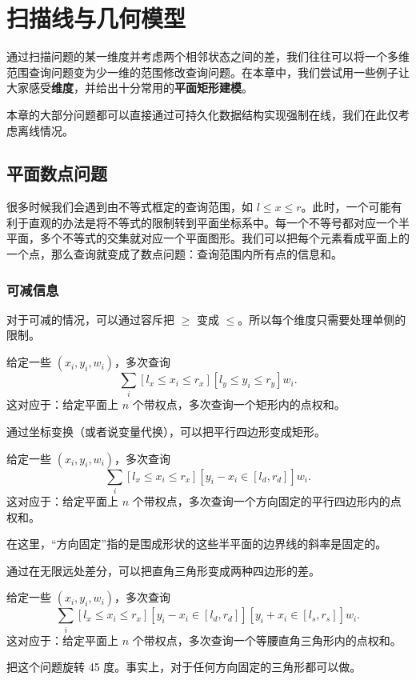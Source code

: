 \chapter{扫描线与几何模型}

通过扫描问题的某一维度并考虑两个相邻状态之间的差，我们往往可以将一个多维范围查询问题变为少一维的范围修改查询问题。在本章中，我们尝试用一些例子让大家感受\textbf{维度}，并给出十分常用的\textbf{平面矩形建模}。

本章的大部分问题都可以直接通过可持久化数据结构实现强制在线，我们在此仅考虑离线情况。


\section{平面数点问题}

很多时候我们会遇到由不等式框定的查询范围，如 $l\le x\le r$。此时，一个可能有利于直观的办法是将不等式的限制转到平面坐标系中。每一个不等号都对应一个半平面，多个不等式的交集就对应一个平面图形。我们可以把每个元素看成平面上的一个点，那么查询就变成了数点问题：查询范围内所有点的信息和。

\subsection{可减信息}

对于可减的情况，可以通过容斥把 $\ge$ 变成 $\le$。所以每个维度只需要处理单侧的限制。

\begin{example}[矩形数点]
    给定一些 $(x_i,y_i,w_i)$，多次查询
    $$
    \sum_i [l_x\le x_i\le r_x][l_y\le y_i\le r_y]w_i.
    $$
    这对应于：给定平面上 $n$ 个带权点，多次查询一个矩形内的点权和。
\end{example}

通过坐标变换（或者说变量代换），可以把平行四边形变成矩形。

\begin{example}[平行四边形数点]
    给定一些 $(x_i,y_i,w_i)$，多次查询
    $$
    \sum_i [l_x\le x_i\le r_x][y_i-x_i\in [l_{d},r_{d}]]w_i.
    $$
    这对应于：给定平面上 $n$ 个带权点，多次查询一个方向固定的平行四边形内的点权和。
\end{example}
\begin{remark}
    在这里，“方向固定”指的是围成形状的这些半平面的边界线的斜率是固定的。
\end{remark}

通过在无限远处差分，可以把直角三角形变成两种四边形的差。

\begin{example}[三角形数点]
    给定一些 $(x_i,y_i,w_i)$，多次查询
    $$
    \sum_i [l_x\le x_i\le r_x][y_i-x_i\in [l_{d},r_{d}]][y_i+x_i\in [l_{s},r_{s}]]w_i.
    $$
    这对应于：给定平面上 $n$ 个带权点，多次查询一个等腰直角三角形内的点权和。
\end{example}
\begin{exercise}
    把这个问题旋转 45 度。事实上，对于任何方向固定的三角形都可以做。
\end{exercise}

